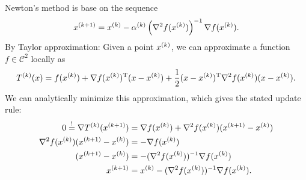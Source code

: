 \documentclass{article}
\begin{document}
Newton's method is base on the sequence
\begin{equation*}
  \kth[k+1]{x} = \kth{x} - \kth{\alpha}\left( \nabla^2 f(\kth{x}) \right)^{-1} \nabla f(\kth{x}).
\end{equation*}
By Taylor approximation: Given a point \(\kth{x}\), we can approximate a function
\(f \in \mathcal{C}^2\) locally as
\begin{equation*}
  \kth{T}(x) = f(\kth{x}) + \T{\nabla f(\kth{x})}(x - \kth{x})
  + \frac{1}{2} \T{(x - \kth{x})} \nabla^2 f(\kth{x})(x - \kth{x}).
\end{equation*}
We can analytically minimize this approximation, which gives the stated update rule:
\begin{align*}
  0 \overset{!}{=} \nabla \kth{T}(\kth[k+1]{x})
      &= \nabla f(\kth{x}) + \nabla^2 f(\kth{x})(\kth[k+1]{x} - \kth{x}) \\
  \nabla^2 f(\kth{x})(\kth[k+1]{x} - \kth{x}) &= -\nabla f(\kth{x}) \\
  (\kth[k+1]{x} - \kth{x}) &= -(\nabla^2 f(\kth{x}))^{-1} \nabla f(\kth{x}) \\
  \kth[k+1]{x} &= \kth{x} - (\nabla^2 f(\kth{x}))^{-1} \nabla f(\kth{x}).
\end{align*}
\end{document}
